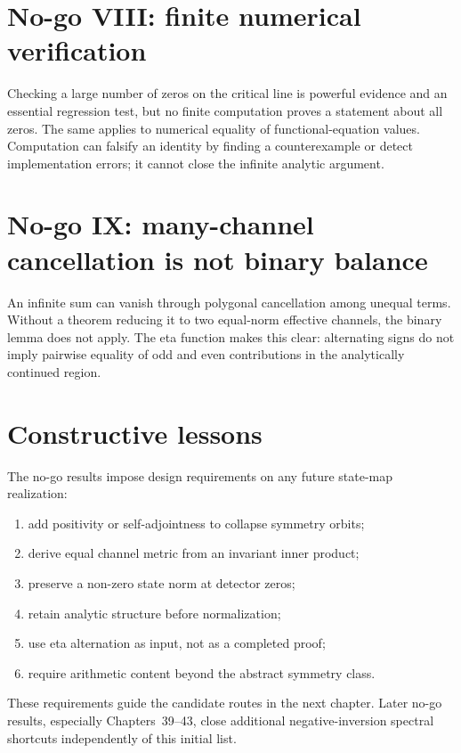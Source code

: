 \section{No-go VIII: finite numerical verification}

Checking a large number of zeros on the critical line is powerful evidence and an essential regression test, but no finite computation proves a statement about all zeros. The same applies to numerical equality of functional-equation values. Computation can falsify an identity by finding a counterexample or detect implementation errors; it cannot close the infinite analytic argument.

\section{No-go IX: many-channel cancellation is not binary balance}

An infinite sum can vanish through polygonal cancellation among unequal terms. Without a theorem reducing it to two equal-norm effective channels, the binary lemma does not apply. The eta function makes this clear: alternating signs do not imply pairwise equality of odd and even contributions in the analytically continued region.

\section{Constructive lessons}

The no-go results impose design requirements on any future state-map realization:
\begin{enumerate}
  \item add positivity or self-adjointness to collapse symmetry orbits;
  \item derive equal channel metric from an invariant inner product;
  \item preserve a non-zero state norm at detector zeros;
  \item retain analytic structure before normalization;
  \item use eta alternation as input, not as a completed proof;
  \item require arithmetic content beyond the abstract symmetry class.
\end{enumerate}
These requirements guide the candidate routes in the next chapter. Later no-go results, especially Chapters~39--43, close additional negative-inversion spectral shortcuts independently of this initial list.


